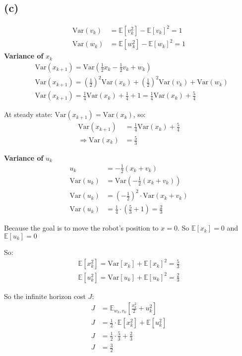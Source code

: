 \documentclass[8pt, a4paper, oneside, justified]{article}
\numberwithin{equation}{section}
\begin{document}
\subsection*{(c)}
\begin{align}
    \text{Var}(v_k) & = \mathbb{E}[v_k^2] - \mathbb{E}[v_k]^2 = 1 \\
    \text{Var}(w_k) & = \mathbb{E}[w_k^2] - \mathbb{E}[w_k]^2 = 1
\end{align}
\textbf{Variance of} $x_k$
\begin{align}
    & \text{Var}(x_{k+1}) = \text{Var}(\frac{1}{2}x_k-\frac{1}{2}v_k+w_k) \\
    & \text{Var}(x_{k+1}) = (\frac{1}{2})^2\text{Var}(x_k) + (\frac{1}{2})^2\text{Var}(v_k) + \text{Var}(w_k) \\
    & \text{Var}(x_{k+1}) = \frac{1}{4}\text{Var}(x_k) + \frac{1}{4} + 1 = \frac{1}{4}\text{Var}(x_k) + \frac{5}{4}
\end{align}

At steady state: $\text{Var}(x_{k+1}) = \text{Var}(x_{k})$, so:
\begin{align}
    \text{Var}(x_{k+1}) & = \frac{1}{4}\text{Var}(x_k) + \frac{5}{4} \\
    \Rightarrow \text{Var}(x_{k}) & = \frac{5}{3}
\end{align}

\textbf{Variance of} $u_k$
\begin{align}
    u_k & = -\frac{1}{2}(x_k+v_k) \\
    \text{Var}(u_k) & = \text{Var}(-\frac{1}{2}(x_k + v_k)) \\
    \text{Var}(u_k) & = (-\frac{1}{2})^2\cdot\text{Var}(x_k + v_k) \\
    \text{Var}(u_k) & = \frac{1}{4}\cdot (\frac{5}{3} + 1) = \frac{2}{3}
\end{align}

Because the goal is to move the robot's position to $x=0$. So $\mathbb{E}[x_k] = 0$ 
and $\mathbb{E}[u_k] = 0$

So: 
\begin{align}
    \mathbb{E}[x_k^2] = \text{Var}[x_k] + \mathbb{E}[x_k]^2 = \frac{5}{3} \\
    \mathbb{E}[u_k^2] = \text{Var}[u_k] + \mathbb{E}[u_k]^2 = \frac{2}{3}
\end{align}

So the infinite horizon cost $J$:
\begin{align}
    J & = \mathbb{E}_{w_k,v_k}[\frac{x_k^2}{2}+u_k^2] \\
    J & = \frac{1}{2}\cdot \mathbb{E}[x_k^2] + \mathbb{E}[u_k^2] \\
    J & = \frac{1}{2}\cdot \frac{5}{3} + \frac{2}{3} \\
    J & = \frac{3}{2}
\end{align}
\end{document}
